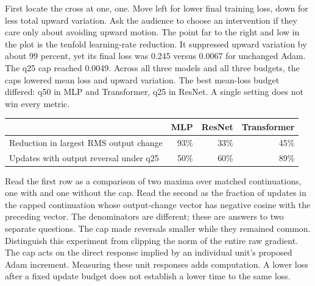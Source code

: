 {
}
{First locate the cross at one, one. Move left for lower final training loss, down for less total upward variation. Ask the audience to choose an intervention if they care only about avoiding upward motion. The point far to the right and low in the plot is the tenfold learning-rate reduction. It suppressed upward variation by about 99 percent, yet its final loss was 0.245 versus 0.0067 for unchanged Adam. The q25 cap reached 0.0049. Across all three models and all three budgets, the caps lowered mean loss and upward variation. The best mean-loss budget differed: q50 in MLP and Transformer, q25 in ResNet. A single setting does not win every metric.}

{\begin{center}\renewcommand{\arraystretch}{1.4}
\begin{tabular}{@{}lrrr@{}}\toprule
 & MLP & ResNet & Transformer\\\midrule
Reduction in largest RMS output change & 93\% & 33\% & 45\%\\
Updates with output reversal under q25 & 50\% & 60\% & 89\%\\\bottomrule
\end{tabular}\end{center}
\vspace{3mm}}
{Read the first row as a comparison of two maxima over matched continuations, one with and one without the cap. Read the second as the fraction of updates in the capped continuation whose output-change vector has negative cosine with the preceding vector. The denominators are different; these are answers to two separate questions. The cap made reversals smaller while they remained common. Distinguish this experiment from clipping the norm of the entire raw gradient. The cap acts on the direct response implied by an individual unit's proposed Adam increment. Measuring these unit responses adds computation. A lower loss after a fixed update budget does not establish a lower time to the same loss.}

